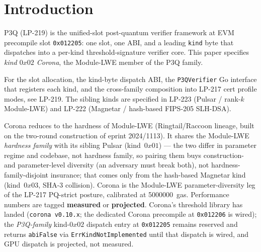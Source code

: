 \section{Introduction}

P3Q (LP-219) is the unified-slot post-quantum verifier framework at
EVM precompile slot \texttt{0x012205}: one slot, one ABI, and a
leading \texttt{kind} byte that dispatches into a per-kind
threshold-signature verifier core. This paper specifies
\emph{kind $0x02$ Corona}, the Module-LWE member of the P3Q family.

For the slot allocation, the kind-byte dispatch ABI, the
\texttt{P3QVerifier} Go interface that registers each kind, and the
cross-family composition into LP-217 cert profile modes, see LP-219.
The sibling kinds are specified in LP-223 (Pulsar / rank-$k$
Module-LWE) and LP-222 (Magnetar / hash-based FIPS-205 SLH-DSA).

Corona reduces to the hardness of Module-LWE (Ringtail/Raccoon lineage,
built on the two-round construction of eprint 2024/1113). It shares the
Module-LWE \emph{hardness family} with its sibling Pulsar
(kind~$0x01$) --- the two differ in parameter regime and codebase, not
hardness family, so pairing them buys construction- and parameter-level
diversity (an adversary must break both), not hardness-family-disjoint
insurance; that comes only from the hash-based Magnetar kind
(kind~$0x03$, SHA-3 collision). Corona is the Module-LWE
parameter-diversity leg of the LP-217 PQ-strict posture, calibrated at
\SI{5000000}{gas}. Performance numbers are tagged \textbf{measured} or
\textbf{projected}. Corona's threshold library has landed (\texttt{corona
v0.10.x}; the dedicated Corona precompile at \texttt{0x012206} is wired);
the \emph{P3Q-family} kind-$0x02$ dispatch entry at \texttt{0x012205}
remains reserved and returns \texttt{abiFalse} via
\texttt{ErrKindNotImplemented} until that dispatch is wired, and GPU
dispatch is projected, not measured.
